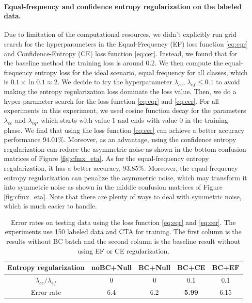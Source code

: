 \paragraph{Equal-frequency and confidence entropy regularization on the labeled data.}
Due to limitation of the computational resources, we didn't explicitly run grid search for the hyperparameters in the Equal-Frequency (EF) loss function  \eqref{eq:eqr} and Confidence-Entropy (CE) loss function \eqref{eq:cer}. Instead, we found that for the baseline method the training loss is around 0.2. We then compute the equal-frequency entropy loss for the ideal scenario, equal frequency for all classes, which is $ 0.1 \times \ln 0.1 \approx 2 $. We decide to try the hyperparameter $\lambda_{ce}$, $\lambda_{ef}\leq 0.1$ to avoid making the entropy regularization loss dominate the loss value. Then, we do a hyper-parameter search for the loss function \eqref{eq:eqr} and \eqref{eq:cer}. For all experiments in this experiment, we used cosine function decay for the parameters $\lambda_{ce}$ and $\lambda_{eq}$, which starts with value $1$ and ends with value $0$ in the training phase. We find that using the loss function \eqref{eq:cer} can achieve a better accuracy performance $94.01\%$. Moreover, as an advantage, using the confidence entropy regularization can reduce the asymmetric noise as shown in the bottom confusion matrices of Figure \ref{fig:cfmx_eta}. 
As for the equal-frequency entropy regularization, it has a better accuracy, $93.85\%$. Moreover, the equal-frequency entropy regularization can penalize the asymmetric noise, which may transform it into symmetric noise as shown in the middle confusion matrices of Figure \ref{fig:cfmx_eta}. Note that there are plenty of ways to deal with symmetric noise, which is much easier to handle.

\begin{table}[!h]
\centering
\caption{Error rates on testing data using the loss function \eqref{eq:eqr} and \eqref{eq:cer}. The experiments use 150 labeled data and CTA for training. The first column is the results without BC batch and the second column is the baseline result without using EF or CE regularization.}\label{tab:hp_e}
\begin{tabular}{ccccc}
\hline
Entropy regularization & noBC+Null & BC+Null   & BC+CE    & BC+EF \\ \hline
$\lambda_{ce}/\lambda_{ef}$ & 0  &0  &    0.1 & 0.1 \\ \hline
Error rate    & 6.4 &6.2&    \textbf{5.99}    & 6.15 \\ \hline
\end{tabular}
\end{table}

